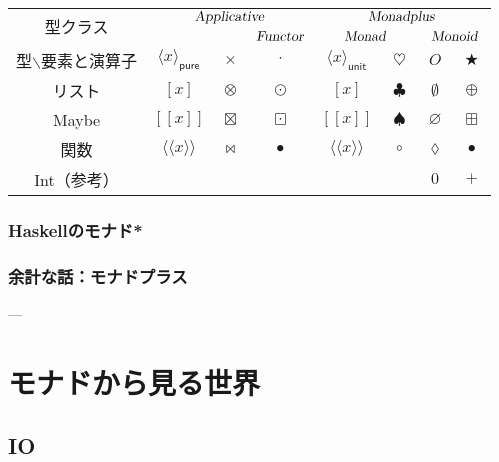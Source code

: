 \documentclass[twocolumn]{jsbook}
\def\[{[\![}
\def\]{]\!]}
\newcommand{\hsklTypeclass}[1]{\textsl{#1}}
\DeclareMathOperator{\hsklApplicativeMap}{\times}
\DeclareMathOperator{\hsklApplicativeListMap}{\otimes}
\DeclareMathOperator{\hsklApplicativeMaybeMap}{\boxtimes}
\DeclareMathOperator{\hsklFmap}{\cdot}
\DeclareMathOperator{\hsklMap}{\odot}
\DeclareMathOperator{\hsklMaybeAppend}{\boxplus}
\DeclareMathOperator{\hsklMaybeMap}{\boxdot}
\DeclareMathOperator{\hsklMonadMap}{\heartsuit}
\newcommand{\hsklAppend}{\oplus}
\newcommand{\hsklApplicative}{\hsklTypeclass{Applicative}}
\newcommand{\hsklEmptyList}{\emptyset}
\newcommand{\hsklFunctor}{\hsklTypeclass{Functor}}
\newcommand{\hsklMonad}{\hsklTypeclass{Monad}}
\newcommand{\hsklMonadplus}{\hsklTypeclass{Monadplus}}
\newcommand{\hsklMonoid}{\hsklTypeclass{Monoid}}
\newcommand{\hsklNothing}{\varnothing}
\newcommand{\hsklJust}[1]{\[#1\]}
\newcommand{\hsklPure}[1]{\langle#1\rangle_\textsf{pure}}
\newcommand{\hsklUnit}[1]{\langle#1\rangle_\textsf{unit}}
\DeclareMathOperator{\mathAnyBinaryOperator}{\bigstar}
\DeclareMathOperator{\mathCompose}{\bullet}
\newcommand{\mathLambdaAnonymousParameter}{\lozenge}
\begin{document}
\begin{table*}
\begin{center}
\begin{tabular}{||c||c|c|c|c|c|c|c||}
\hline
\multirow{2}{*}{型クラス}
    &\multicolumn{3}{|c|}{$\hsklApplicative$}
    &\multicolumn{4}{|c||}{$\hsklMonadplus$}\\
\cline{4-8}
\multirow{1}{*}{}
    &\multicolumn{2}{|c|}{ }
    &$\hsklFunctor$
    &\multicolumn{2}{|c}{$\hsklMonad$}
    &\multicolumn{2}{|c||}{$\hsklMonoid$}\\
\hline\hline
型$\backslash$要素と演算子
    &$\hsklPure{x}$
    &$\hsklApplicativeMap$
    &$\hsklFmap$
    &$\hsklUnit{x}$
    &$\hsklMonadMap$
    &$O$
    &$\mathAnyBinaryOperator$\\
\hline
リスト
    &$[x]$
    &$\hsklApplicativeListMap$
    &$\hsklMap$
    &$[x]$
    &$\clubsuit$
    &$\hsklEmptyList$
    &$\hsklAppend$\\
\hline
Maybe
    &$\hsklJust{x}$
    &$\hsklApplicativeMaybeMap$
    &$\hsklMaybeMap$
    &$\hsklJust{x}$
    &$\spadesuit$
    &$\hsklNothing$
    &$\hsklMaybeAppend$\\
\hline
関数
    &$\langle\!\langle x\rangle\!\rangle$
    &$\bowtie$
    &$\mathCompose$
    &$\langle\!\langle x\rangle\!\rangle$
    &$\circ$
    &$\mathLambdaAnonymousParameter$
    &$\mathCompose$\\
\hline
Int（参考）
    &
    &
    &
    &
    &
    &$0$
    &$+$\\
\hline
\end{tabular}
\end{center}
\end{table*}


\section{Haskellのモナド*}

\section{余計な話：モナドプラス}


---

\part{モナドから見る世界}

\chapter{IO}
\end{document}

